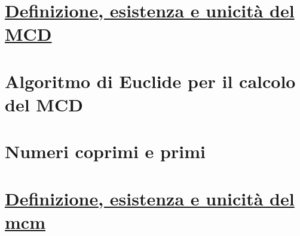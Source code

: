 \documentclass[oneside]{book}
\begin{document}
\section{\underline{Definizione, esistenza e unicità del MCD}}
\section{Algoritmo di Euclide per il calcolo del MCD}
\section{Numeri coprimi e primi}
\section{\underline{Definizione, esistenza e unicità del mcm}}
\end{document}
